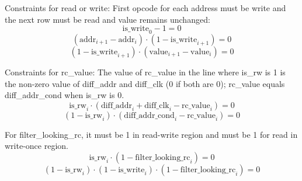 Constraints for read or write: First opcode for each address must be write and the next row must be read and value remains unchanged:
\[ \mathrm{is\_write}_0-1=0 \]
\[ (\mathrm{addr}_{i+1}-\mathrm{addr}_i) \cdot (1-\mathrm{is\_write}_{i+1})=0 \]
\[ (1-\mathrm{is\_write}_{i+1}) \cdot (\mathrm{value}_{i+1}-\mathrm{value}_i)=0 \]

Constraints for rc\_value:
The value of rc\_value in the line where is\_rw is 1 is the non-zero value of diff\_addr and diff\_clk (0 if both are 0); rc\_value equals diff\_addr\_cond when is\_rw is 0.
\[ \mathrm{is\_rw}_i \cdot (\mathrm{diff\_addr}_i + \mathrm{diff\_clk}_i - \mathrm{rc\_value}_i)=0 \]
\[ (1-\mathrm{is\_rw}_i) \cdot (\mathrm{diff\_addr\_cond}_i - \mathrm{rc\_value}_i)=0 \]

For filter\_looking\_rc, it must be 1 in read-write region and must be 1 for read in write-once region.
\[ \mathrm{is\_rw}_i \cdot (1-\mathrm{filter\_looking\_rc}_i)=0 \]
\[ (1-\mathrm{is\_rw}_i) \cdot (1-\mathrm{is\_write}_i) \cdot (1-\mathrm{filter\_looking\_rc}_i)=0 \]